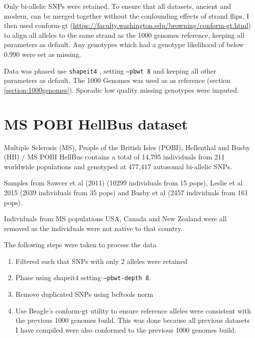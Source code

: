 Only bi-allelic SNPs were retained. To ensure that all datasets, ancient and modern, can be merged together without the confounding effects of strand flips, I then used conform-gt (\url{https://faculty.washington.edu/browning/conform-gt.html}) to align all alleles to the same strand as the 1000 genomes reference, keeping all parameters as default. Any genotypes which had a genotype likelihood of below 0.990 were set as missing.

Data was phased use \texttt{shapeit4} \cite{delaneau2018integrative}, setting \texttt{--pbwt 8} and keeping all other parameters as default. The 1000 Genomes was used as as reference (section \ref{section:1000genomes}). Sporadic low quality missing genotypes were imputed. 



\section{MS POBI HellBus dataset} \label{section:MSPOBIHellBus}


Multiple Sclerosis (MS), People of the British Isles (POBI), Hellenthal and Busby (HB) / MS POBI HellBus contains a total of 14,795 individuals from 211 worldwide populations and genotyped at 477,417 autosomal bi-allelic SNPs. 

Samples from Sawcer et al (2011) \cite{Sawcer2011} (10299 individuals from 15 pops), Leslie et al 2015 \cite{Leslie2015} (2039 individuals from 35 pops) and Busby et al (2457 individuals from  161 pops). 

Individuals from MS populations USA, Canada and New Zealand were all removed as the individuals were not native to that country.

The following steps were taken to process the data

\begin{enumerate}
\item Filtered such that SNPs with only 2 alleles were retained
\item Phase using shapeit4 \cite{delaneau2018integrative} setting \texttt{--pbwt-depth 8}.
\item Remove duplicated SNPs using bcftools norm \cite{li2009sequence} 
\item Use Beagle's conform-gt utility to ensure reference alleles were consistent with the previous 1000 genomes build. This was done because all previous datasets I have compiled were also conformed to the previous 1000 genomes build. 
\end{enumerate}

